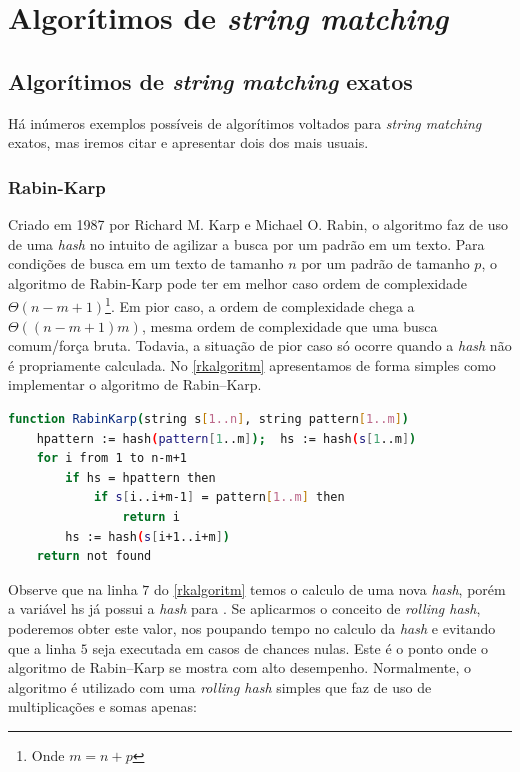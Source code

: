 \section{\nmu Algorítimos de  \textit{string matching}} %
\label{sec:algoritimos_de_textit}

\subsection{\nmu Algorítimos de \textit{string matching} exatos} %
\label{sub:algoritimos_de_textit}

Há inúmeros exemplos possíveis de algorítimos voltados para \textit{string matching} exatos, mas iremos citar e apresentar dois dos mais usuais.

\subsubsection*{Rabin-Karp} %
\label{ssub:rabin_karp}

Criado  em 1987  por  Richard M. Karp e Michael O. Rabin, o algoritmo faz de uso de uma \textit{hash} no intuito de agilizar a busca por um padrão em um texto. Para condições de busca em um texto de tamanho $n$ por um padrão de tamanho $p$, o algoritmo de Rabin-Karp pode ter em melhor caso ordem de complexidade $\Theta(n-m+1)$\cite{paulo2015algoritmos}\footnote{Onde $m=n+p$}. Em pior caso, a ordem de complexidade chega a $\Theta((n-m+1)m)$, mesma ordem de complexidade que uma busca comum/força bruta\cite{paulo2015algoritmos}. Todavia, a situação de pior caso só ocorre quando a \textit{hash} não é propriamente calculada. No \autoref{rkalgoritm} apresentamos de forma simples como implementar o algoritmo de Rabin–Karp.

\begin{lstlisting}[language=Bash,label=rkalgoritm,caption={Algoritmo de Rabin–Karp}]
function RabinKarp(string s[1..n], string pattern[1..m])
	hpattern := hash(pattern[1..m]);  hs := hash(s[1..m])
	for i from 1 to n-m+1
		if hs = hpattern then
			if s[i..i+m-1] = pattern[1..m] then
				return i
		hs := hash(s[i+1..i+m])
	return not found
\end{lstlisting}

Observe que na linha $7$ do \autoref{rkalgoritm} temos o calculo de uma nova \textit{hash}, porém a variável {\code hs} já possui a \textit{hash} para {}. Se aplicarmos o conceito de \textit{rolling hash}, poderemos obter este valor, nos poupando tempo no calculo da \textit{hash} e evitando que a linha $5$ seja executada em casos de chances nulas. Este é o ponto onde o algoritmo de Rabin–Karp se mostra com alto desempenho. Normalmente, o algoritmo é utilizado com uma \textit{rolling hash} simples que faz de uso  de multiplicações e somas apenas:

